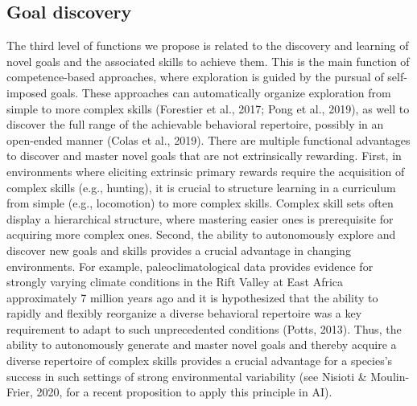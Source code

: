 \subsection{Goal discovery} The third level of functions we propose is related to the discovery and learning of novel goals and the associated skills to achieve them. This is the main function of competence-based approaches, where exploration is guided by the pursual of self-imposed goals. These approaches can automatically organize exploration from simple to more complex skills (Forestier et al., 2017; Pong et al., 2019), as well to discover the full range of the achievable behavioral repertoire, possibly in an open-ended manner (Colas et al., 2019). There are multiple functional advantages to discover and master novel goals that are not extrinsically rewarding. First, in environments where eliciting extrinsic primary rewards require the acquisition of complex skills (e.g., hunting), it is crucial to structure learning in a curriculum from simple (e.g., locomotion) to more complex skills. Complex skill sets often display a hierarchical structure, where mastering easier ones is prerequisite for acquiring more complex ones. Second, the ability to autonomously explore and discover new goals and skills provides a crucial advantage in changing environments. For example, paleoclimatological data provides evidence for strongly varying climate conditions in the Rift Valley at East Africa approximately 7 million years ago and it is hypothesized that the ability to rapidly and flexibly reorganize a diverse behavioral repertoire was a key requirement to adapt to such unprecedented conditions (Potts, 2013). Thus, the ability to autonomously generate and master novel goals and thereby acquire a diverse repertoire of complex skills provides a crucial advantage for a species's success in such settings of strong environmental variability (see Nisioti \& Moulin-Frier, 2020, for a recent proposition to apply this principle in \ac{AI}).

